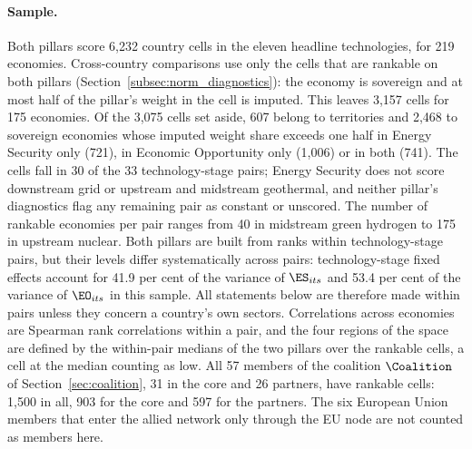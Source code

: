 
\paragraph{Sample.} Both pillars score 6{,}232 country cells in the eleven headline technologies,
for 219 economies. Cross-country comparisons use only the cells that are rankable on both pillars
(Section~\ref{subsec:norm_diagnostics}): the economy is sovereign and at most half of the
pillar's weight in the cell is imputed. This leaves 3{,}157 cells for 175 economies. Of the
3{,}075 cells set aside, 607 belong to territories and 2{,}468 to sovereign economies whose
imputed weight share exceeds one half in Energy Security only (721), in Economic Opportunity only
(1{,}006) or in both (741). The cells fall in 30 of the 33 technology-stage pairs; Energy
Security does not score downstream grid or upstream and midstream geothermal, and neither
pillar's diagnostics flag any remaining pair as constant or unscored. The number of rankable
economies per pair ranges from 40 in midstream green hydrogen to 175 in upstream nuclear. Both
pillars are built from ranks within technology-stage pairs, but their levels differ
systematically across pairs: technology-stage fixed effects account for 41.9 per cent of the
variance of $\ES_{its}$ and 53.4 per cent of the variance of $\EO_{its}$ in this sample. All
statements below are therefore made within pairs unless they concern a country's own sectors.
Correlations across economies are Spearman rank correlations within a pair, and the four regions
of the space are defined by the within-pair medians of the two pillars over the rankable cells, a
cell at the median counting as low. All 57 members of the coalition $\Coalition$ of
Section~\ref{sec:coalition}, 31 in the core and 26 partners, have rankable cells: 1{,}500 in all,
903 for the core and 597 for the partners. The six European Union members that enter the allied
network only through the EU node are not counted as members here.

